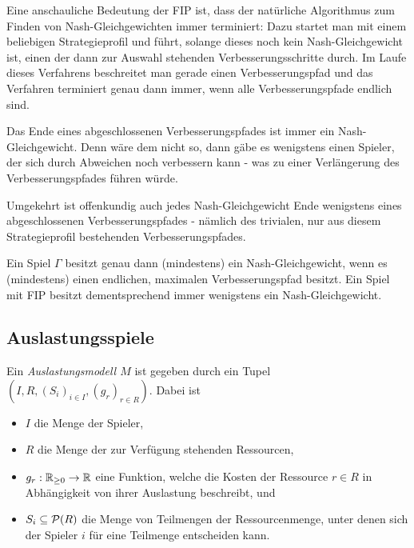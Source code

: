 Eine anschauliche Bedeutung der FIP ist, dass der natürliche Algorithmus zum Finden von Nash-Gleichgewichten immer terminiert: Dazu startet man mit einem beliebigen Strategieprofil und führt, solange dieses noch kein Nash-Gleichgewicht ist, einen der dann zur Auswahl stehenden Verbesserungsschritte durch. Im Laufe dieses Verfahrens beschreitet man gerade einen Verbesserungspfad und das Verfahren terminiert genau dann immer, wenn alle Verbesserungspfade endlich sind.

\begin{beob}\label{beob:VerbPfadeundNGe}
	Das Ende eines abgeschlossenen Verbesserungspfades ist immer ein Nash-Gleichgewicht. Denn wäre dem nicht so, dann gäbe es wenigstens einen Spieler, der sich durch Abweichen noch verbessern kann - was zu einer Verlängerung des Verbesserungspfades führen würde. 
		
	Umgekehrt ist offenkundig auch jedes Nash-Gleichgewicht Ende wenigstens eines abgeschlossenen Verbesserungspfades - nämlich des trivialen, nur aus diesem Strategieprofil bestehenden Verbesserungspfades.
\end{beob}

\begin{kor}\label{kor:ExVerbPfadExNG}
	Ein Spiel $\Gamma$ besitzt genau dann (mindestens) ein Nash-Gleichgewicht, wenn es (mindestens) einen endlichen, maximalen Verbesserungspfad besitzt. Ein Spiel mit FIP besitzt dementsprechend immer wenigstens ein Nash-Gleichgewicht.
\end{kor}


\subsection{Auslastungsspiele}

\begin{defn}\label{def:Auslastungsmodel}
	Ein \emph{Auslastungsmodell $M$} ist gegeben durch ein Tupel $(I, R, (S_i)_{i\in I}, (g_r)_{r \in R})$. Dabei ist
	\begin{itemize}
		\item $I$ die Menge der Spieler,
		\item $R$ die Menge der zur Verfügung stehenden Ressourcen,
		\item $g_r: \mathbb{R}_{\geq 0} \to \mathbb{R}$ eine Funktion, welche die Kosten der Ressource $r \in R$ in Abhängigkeit von ihrer Auslastung beschreibt, und
		\item $S_i \subseteq \mathcal{P}(R)$ die Menge von Teilmengen der Ressourcenmenge, unter denen sich der Spieler $i$ für eine Teilmenge entscheiden kann. 
	\end{itemize}
\end{defn}

